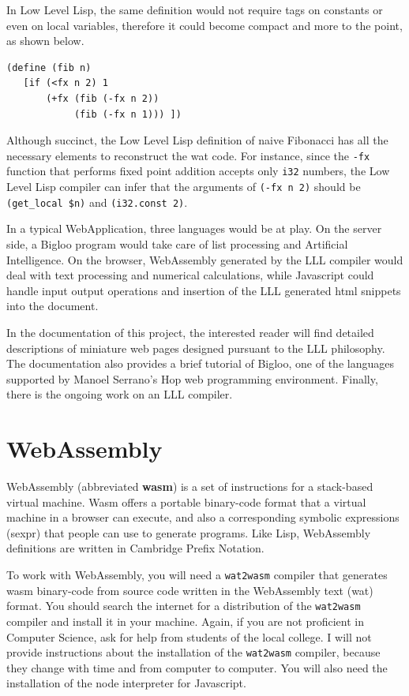 \documentclass[a4paper,12pt]{book}
\begin{document}
In Low Level Lisp, the same definition would not require
tags on constants or even on local variables, therefore it
could become compact and more to the point, as shown below.


\begin{verbatim}
(define (fib n)
   [if (<fx n 2) 1
       (+fx (fib (-fx n 2))
            (fib (-fx n 1))) ])
\end{verbatim}

Although succinct, the Low Level Lisp definition
of naive Fibonacci has all the necessary elements
to reconstruct the wat code. For instance, since
the \verb|-fx| function that performs fixed point
addition accepts only \verb|i32| numbers, the Low
Level Lisp compiler can infer that the arguments
of \verb|(-fx n 2)| should be \verb|(get_local $n)|
and \verb|(i32.const 2)|.

In a typical WebApplication, three languages would be
at play. On the server side, a Bigloo program would
take care of list processing and Artificial
Intelligence. On the browser, WebAssembly generated
by the LLL compiler would deal with text processing
and numerical calculations, while Javascript could
handle input output operations and insertion of
the LLL generated html snippets into the document.

In the documentation of this project, the interested
reader will find detailed descriptions of miniature
web pages designed pursuant to the LLL philosophy.
The documentation also provides a brief
tutorial of Bigloo, one of the languages supported
by Manoel Serrano's Hop web programming environment.
Finally, there is the ongoing work on an LLL compiler.


\chapter{WebAssembly}

WebAssembly (abbreviated {\bf wasm}) is a set of instructions
for a stack-based virtual machine. Wasm offers a portable
binary-code format that a virtual machine in a browser
can execute, and also a corresponding symbolic
expressions (sexpr) that people can use to generate
programs. Like Lisp, WebAssembly definitions are written
in Cambridge Prefix Notation.

To work with WebAssembly, you will need a \verb|wat2wasm|
compiler that generates wasm binary-code from source
code written in the WebAssembly text (wat) format.
You should search the internet for a distribution of
the \verb|wat2wasm| compiler and install it in your
machine. Again, if you are not proficient in Computer
Science, ask for help from students of the local college.
I will not provide instructions about the installation
of the \verb|wat2wasm| compiler, because they change
with time and from computer to computer. You will also
need the installation of the node interpreter for
Javascript.
\end{document}

